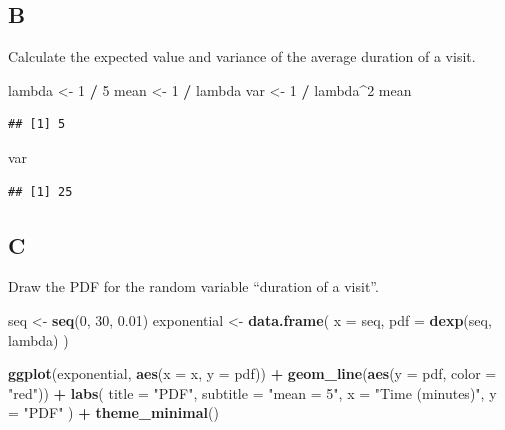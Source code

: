 \documentclass[
]{article}
\newenvironment{Shaded}{\begin{snugshade}}{\end{snugshade}}
\newcommand{\DataTypeTok}[1]{\textcolor[rgb]{0.13,0.29,0.53}{#1}}
\newcommand{\DecValTok}[1]{\textcolor[rgb]{0.00,0.00,0.81}{#1}}
\newcommand{\FloatTok}[1]{\textcolor[rgb]{0.00,0.00,0.81}{#1}}
\newcommand{\KeywordTok}[1]{\textcolor[rgb]{0.13,0.29,0.53}{\textbf{#1}}}
\newcommand{\NormalTok}[1]{#1}
\newcommand{\OperatorTok}[1]{\textcolor[rgb]{0.81,0.36,0.00}{\textbf{#1}}}
\newcommand{\StringTok}[1]{\textcolor[rgb]{0.31,0.60,0.02}{#1}}
\begin{document}
\hypertarget{b-3}{%
\subsection{B}\label{b-3}}

Calculate the expected value and variance of the average duration of a
visit.

\begin{Shaded}
\begin{Highlighting}[]
\NormalTok{lambda \textless{}{-}}\StringTok{ }\DecValTok{1} \OperatorTok{/}\StringTok{ }\DecValTok{5}
\NormalTok{mean \textless{}{-}}\StringTok{ }\DecValTok{1} \OperatorTok{/}\StringTok{ }\NormalTok{lambda}
\NormalTok{var \textless{}{-}}\StringTok{ }\DecValTok{1} \OperatorTok{/}\StringTok{ }\NormalTok{lambda}\OperatorTok{\^{}}\DecValTok{2}
\NormalTok{mean}
\end{Highlighting}
\end{Shaded}

\begin{verbatim}
## [1] 5
\end{verbatim}

\begin{Shaded}
\begin{Highlighting}[]
\NormalTok{var}
\end{Highlighting}
\end{Shaded}

\begin{verbatim}
## [1] 25
\end{verbatim}

\hypertarget{c-2}{%
\subsection{C}\label{c-2}}

Draw the PDF for the random variable ``duration of a visit''.

\begin{Shaded}
\begin{Highlighting}[]
\NormalTok{seq \textless{}{-}}\StringTok{ }\KeywordTok{seq}\NormalTok{(}\DecValTok{0}\NormalTok{, }\DecValTok{30}\NormalTok{, }\FloatTok{0.01}\NormalTok{)}
\NormalTok{exponential \textless{}{-}}\StringTok{ }\KeywordTok{data.frame}\NormalTok{(}
  \DataTypeTok{x =}\NormalTok{ seq,}
  \DataTypeTok{pdf =} \KeywordTok{dexp}\NormalTok{(seq, lambda)}
\NormalTok{)}

\KeywordTok{ggplot}\NormalTok{(exponential, }\KeywordTok{aes}\NormalTok{(}\DataTypeTok{x =}\NormalTok{ x, }\DataTypeTok{y =}\NormalTok{ pdf)) }\OperatorTok{+}
\StringTok{  }\KeywordTok{geom\_line}\NormalTok{(}\KeywordTok{aes}\NormalTok{(}\DataTypeTok{y =}\NormalTok{ pdf, }\DataTypeTok{color =} \StringTok{"red"}\NormalTok{)) }\OperatorTok{+}
\StringTok{  }\KeywordTok{labs}\NormalTok{(}
    \DataTypeTok{title =} \StringTok{"PDF"}\NormalTok{,}
    \DataTypeTok{subtitle =} \StringTok{"mean = 5"}\NormalTok{,}
    \DataTypeTok{x =} \StringTok{"Time (minutes)"}\NormalTok{,}
    \DataTypeTok{y =} \StringTok{"PDF"}
\NormalTok{  ) }\OperatorTok{+}
\StringTok{  }\KeywordTok{theme\_minimal}\NormalTok{()}
\end{Highlighting}
\end{Shaded}
\end{document}
